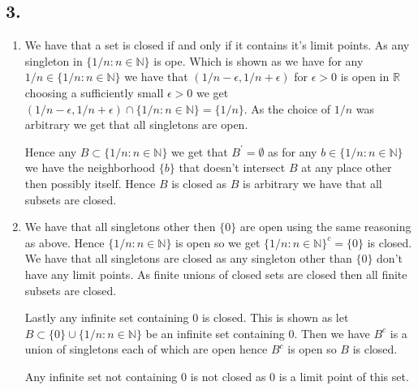 \documentclass{amsart}
\theoremstyle{plain}
\theoremstyle{definition}
\theoremstyle{remark}
\begin{document}
\subsection*{3.}
\begin{enumerate}[label=(\alph*)]
    \item {We have that a set is closed if and only if it contains it's limit points. As any singleton in $\{1/n: n\in \mathbb{N}\}$ is ope. Which is shown as we have for any $1/n\in \{1/n:n\in \mathbb{N}\}$ we have that $(1/n-\epsilon, 1/n+\epsilon)$ for $\epsilon >0$ is open in $\mathbb{R}$ choosing a sufficiently small $\epsilon>0$ we get $(1/n-\epsilon,1/n+\epsilon)\cap \{1/n:n\in \mathbb{N}\}=\{1/n\}$. As the choice of $1/n$ was arbitrary we get that all singletons are open.
    
    Hence any $B\subset \{1/n: n\in \mathbb N\}$ we get that $B^\prime=\emptyset$ as for any $b\in \{1/n:n\in \mathbb N\}$ we have the neighborhood $\{b\}$ that doesn't intersect $B$ at any place other then possibly itself. Hence $B$ is closed as $B$ is arbitrary we have that all subsets are closed. 
    }
    \item {We have that all singletons other then $\{0\}$ are open using the same reasoning as above. Hence $\{1/n: n\in \mathbb{N}\}$ is open so we get $\{1/n: n\in \mathbb{N}\}^c=\{0\}$ is closed. We have that all singletons are closed as any singleton other than $\{0\}$ don't have any limit points. As finite unions of closed sets are closed then all finite subsets are closed. 
    
    Lastly any infinite set containing $0$ is closed. This is shown as let $B\subset \{0\}\cup \{1/n:n\in \mathbb{N}\}$ be an infinite set containing $0$. Then we have $B^c$ is a union of singletons each of which are open hence $B^c$ is open so $B$ is closed. 
    
    Any infinite set not containing $0$ is not closed as $0$ is a limit point of this set. 
    }
\end{enumerate}
\end{document}
